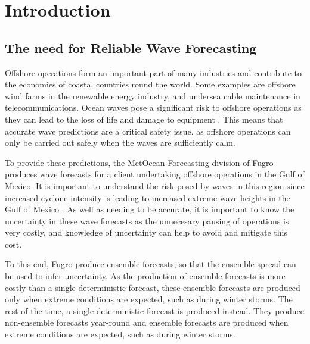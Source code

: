 
\chapter{Introduction} %

\label{Chapter1} %


\section{The need for Reliable Wave Forecasting}

Offshore operations form an important part of many industries and contribute to the economies of coastal countries round the world. Some examples are offshore wind farms in the renewable energy industry, and undersea cable maintenance in telecommunications. Ocean waves pose a significant risk to offshore operations as they can lead to the loss of life and damage to equipment \citep{Adumene2022,Ren2021}. This means that accurate wave predictions are a critical safety issue, as offshore operations can only be carried out safely when the waves are sufficiently calm.

To provide these predictions, the MetOcean Forecasting division of Fugro produces wave forecasts for a client undertaking offshore operations in the Gulf of Mexico. It is important to understand the risk posed by waves in this region since increased cyclone intensity is leading to increased extreme wave heights in the Gulf of Mexico \citep{Appendini2014}. As well as needing to be accurate, it is important to know the uncertainty in these wave forecasts as the unnecesary pausing of operations is very costly, and knowledge of uncertainty can help to avoid and mitigate this cost.

To this end, Fugro produce ensemble forecasts, so that the ensemble spread can be used to infer uncertainty. As the production of ensemble forecasts is more costly than a single deterministic forecast, these ensemble forecasts are produced only when extreme conditions are expected, such as during winter storms. The rest of the time, a single deterministic forecast is produced instead. They produce non-ensemble forecasts year-round and ensemble forecasts are produced when extreme conditions are expected, such as during winter storms.

